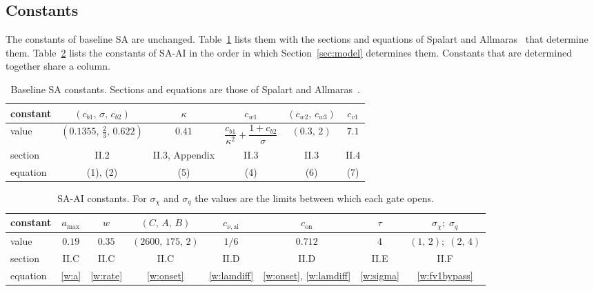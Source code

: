 \documentclass[conf]{new-aiaa}
\newcommand{\con}{c_{\mathrm{on}}}
\begin{document}
\subsection{Constants}

The constants of baseline SA are unchanged. Table~\ref{t:saconstants} lists
them with the sections and equations of Spalart and
Allmaras~\cite{spalart_allmaras_1994} that determine them.
Table~\ref{t:constants} lists the constants of SA-AI in the order in which
Section~\ref{sec:model} determines them. Constants that are determined together
share a column.

\begin{table}[H]\centering\small
\caption{Baseline SA constants. Sections and equations are those of Spalart
and Allmaras~\cite{spalart_allmaras_1994}.}\label{t:saconstants}
\begin{tabular}{lccccc}
\toprule
constant & $(c_{b1},\,\sigma,\,c_{b2})$ & $\kappa$ & $c_{w1}$ & $(c_{w2},\,c_{w3})$ & $c_{v1}$ \\
\midrule
value & $(0.1355,\,\tfrac23,\,0.622)$ & $0.41$
  & $\dfrac{c_{b1}}{\kappa^2}+\dfrac{1+c_{b2}}{\sigma}$ & $(0.3,\,2)$ & $7.1$ \\[6pt]
section & II.2 & II.3, Appendix & II.3 & II.3 & II.4 \\
equation & (1), (2) & (5) & (4) & (6) & (7) \\
\bottomrule
\end{tabular}
\end{table}

\begin{table}[H]\centering\small
\caption{SA-AI constants. For $\sigma_\chi$ and $\sigma_q$ the values are the limits
between which each gate opens.}\label{t:constants}
\begin{tabular}{lccccccc}
\toprule
constant & $a_{\max}$ & $w$ & $(C,\,A,\,B)$ & $c_{\nu,\mathrm{ai}}$ & $\con$
  & $\tau$ & $\sigma_\chi;\;\sigma_q$ \\
\midrule
value & $0.19$ & $0.35$ & $(2600,\,175,\,2)$ & $1/6$ & $0.712$
  & $4$ & $(1,\,2);\;(2,\,4)$ \\
section & II.C & II.C & II.C & II.D & II.D & II.E & II.F \\
equation & \eqref{w:a} & \eqref{w:rate} & \eqref{w:onset} & \eqref{w:lamdiff}
  & \eqref{w:onset}, \eqref{w:lamdiff} & \eqref{w:sigma} & \eqref{w:fv1bypass} \\
\bottomrule
\end{tabular}
\end{table}
\end{document}
